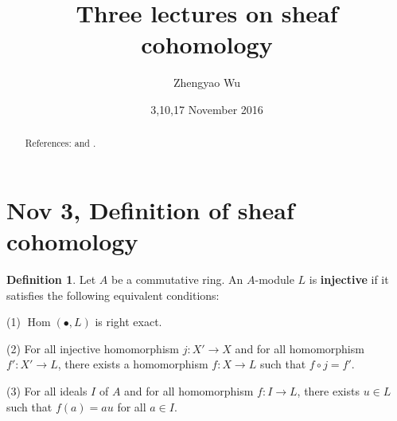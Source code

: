 \documentclass{amsart}
\numberwithin{equation}{section}
\theoremstyle{plain}
\theoremstyle{definition}
\newtheorem{defn}[equation]{Definition}
\DeclareMathOperator{\Hom}{Hom}
\begin{document}
\title%
{Three lectures on sheaf cohomology}
\author{Zhengyao Wu}
\date{3,10,17 November 2016} %
\address{
Department of Mathematics\\
Shantou University\\
243 Daxue Road\\
Shantou, Guangdong, China 515063}
\begin{abstract}
References: \cite{Hartshorne} and \cite{Gro57}. 
\end{abstract}
\maketitle
\tableofcontents

\section{Nov 3, Definition of sheaf cohomology}\label{1}

\begin{defn}\label{1.1}
	Let $ A $ be a commutative ring. 
	An $ A $-module $ L $ is \textbf{injective} if it satisfies the following equivalent conditions:
	
	(1) $ \Hom(\bullet,L) $ is right exact. 
	
	(2) For all injective homomorphism $j:X'\to X $ and for all homomorphism $ f': X'\to L $, there exists a homomorphism $ f :X\to L$ such that $ f\circ j=f' $. 
	
	(3) For all ideals $ I $ of $ A $ and for all homomorphism $ f: I\to L $, there exists $ u\in L $ such that $ f(a)=a u $ for all $ a\in I $. 
\end{defn}
\end{document}
